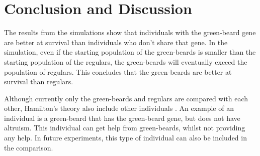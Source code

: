 \documentclass[conference]{IEEEtran}
\begin{document}
	\section{Conclusion and Discussion}
	The results from the simulations show that individuals with the green-beard gene are better at survival than individuals who don't share that gene. In the simulation, even if the starting population of the green-beards is smaller than the starting population of the regulars, the green-beards will eventually exceed the population of regulars. This concludes that the green-beards are better at survival than regulars.
	
	Although currently only the green-beards and regulars are compared with each other, Hamilton's theory also include other individuals \cite{hamilton1964genetical}. An example of an individual is a green-beard that has the green-beard gene, but does not have altruism. This individual can get help from green-beards, whilst not providing any help. In future experiments, this type of individual can also be included in the comparison.
	


	
\end{document}
